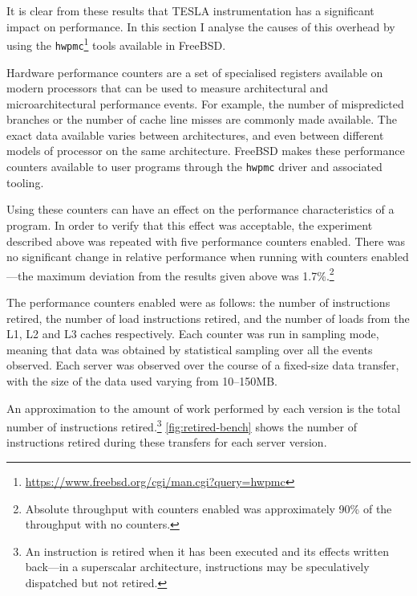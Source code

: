 It is clear from these results that TESLA instrumentation has a
significant impact on performance. In this section I analyse the causes
of this overhead by using the
\texttt{hwpmc}\footnote{\url{https://www.freebsd.org/cgi/man.cgi?query=hwpmc}}
tools available in FreeBSD.

Hardware performance counters are a set of specialised registers
available on modern processors that can be used to measure architectural
and microarchitectural performance events. For example, the number of
mispredicted branches or the number of cache line misses are commonly
made available. The exact data available varies between architectures,
and even between different models of processor on the same architecture.
FreeBSD makes these performance counters available to user programs
through the \texttt{hwpmc} driver and associated tooling.

Using these counters can have an effect on the performance
characteristics of a program. In order to verify that this effect was
acceptable, the experiment described above was repeated with five
performance counters enabled. There was no significant change in
relative performance when running with counters enabled---the maximum
deviation from the results given above was 1.7\%.\footnote{Absolute
throughput with counters enabled was approximately 90\% of the
throughput with no counters.}

The performance counters enabled were as follows: the number of
instructions retired, the number of load instructions retired, and the
number of loads from the L1, L2 and L3 caches respectively. Each counter
was run in sampling mode, meaning that data was obtained by statistical
sampling over all the events observed. Each server was observed over the
course of a fixed-size data transfer, with the size of the data used
varying from 10--150MB.

An approximation to the amount of work performed by each version is the
total number of instructions retired.\footnote{An instruction is retired
when it has been executed and its effects written back---in a
superscalar architecture, instructions may be speculatively dispatched
but not retired.} \autoref{fig:retired-bench} shows the number of
instructions retired during these transfers for each server version.

